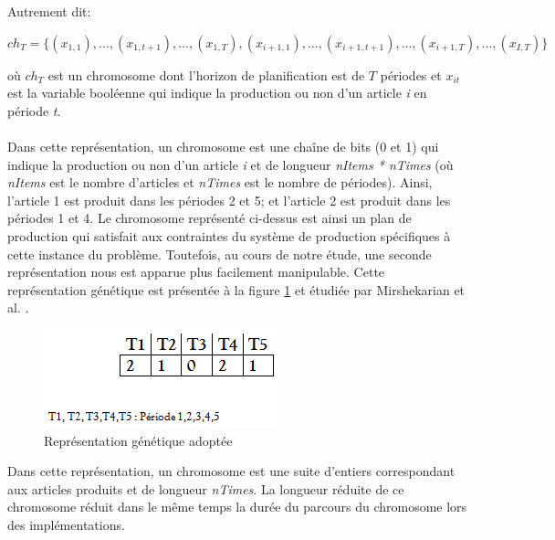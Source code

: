 	Autrement dit:
	\begin{center}
		$ch_{T} = \{(x_{1,1}),..., (x_{1,t+1}),..., ( x_{1,T}), (x_{i+1,1}),...,(x_{i+1, t+1}),..., (x_{i+1,T}),..., (x_{I,T})\}$ \\
	\end{center}
	\hspace*{.5cm} où $ch_{T}$ est un chromosome dont l'horizon de planification est de $T$ périodes et $x_{it}$ est la variable booléenne qui indique la production ou non d'un article \emph{i} en période \emph{t}.  \\
	\\
	\hspace*{.5cm} Dans cette représentation, un chromosome est une chaîne de bits (0 et 1) qui indique la production ou non d'un article \emph{i} et de longueur \emph{nItems * nTimes} (où \emph{nItems} est le nombre d'articles et \emph{nTimes} est le nombre de périodes). Ainsi, l'article 1 est produit dans les périodes 2 et 5; et l'article 2 est produit dans les périodes 1 et 4. Le chromosome représenté ci-dessus est ainsi un plan de production qui satisfait aux contraintes du système de production spécifiques à cette instance du problème. Toutefois, au cours de notre étude, une seconde représentation nous est apparue plus facilement manipulable. Cette représentation génétique est présentée à la figure \ref{fig:adopt_gene_repr} et étudiée par Mirshekarian et al. \cite{suer}.
	
	\begin{figure}[!h]
		\begin{center}
			\includegraphics[scale=.5]{images/adopt_gene_repr.png}
			\caption{Représentation génétique adoptée}
			\label{fig:adopt_gene_repr}
		\end{center}
	\end{figure}
	
	Dans cette représentation, un chromosome est une suite d'entiers correspondant aux articles produits et de longueur \emph{nTimes}. La longueur réduite de ce chromosome réduit dans le même temps la durée du parcours du chromosome lors des implémentations.
